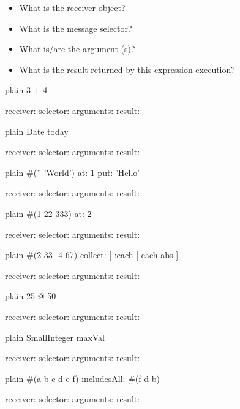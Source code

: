 \documentclass[10pt,twoside,english]{_support/latex/sbabook/sbabook}
\begin{document}
\begin{itemize}
\item What is the receiver object?
\item What is the message selector?
\item What is/are the argument (s)?
\item What is the result returned by this expression execution?
\end{itemize}

\begin{displaycode}{plain}
3 + 4

	receiver: 
	selector:
	arguments:
	result:
\end{displaycode}

\begin{displaycode}{plain}
Date today

	receiver: 
	selector:
	arguments:
	result:
\end{displaycode}

\begin{displaycode}{plain}
#('' 'World') at: 1 put: 'Hello'

	receiver: 
	selector:
	arguments:
	result:
\end{displaycode}

\begin{displaycode}{plain}
#(1 22 333) at: 2

	receiver: 
	selector:
	arguments:
	result:
\end{displaycode}

\begin{displaycode}{plain}
#(2 33 -4 67) collect: [ :each | each abs ]

	receiver: 
	selector:
	arguments:
	result:
\end{displaycode}

\begin{displaycode}{plain}
25 @ 50

	receiver: 
	selector:
	arguments:
	result:
\end{displaycode}

\begin{displaycode}{plain}
SmallInteger maxVal


	receiver: 
	selector:
	arguments:
	result:
\end{displaycode}

\begin{displaycode}{plain}
#(a b c d e f) includesAll: #(f d b)

	receiver: 
	selector:
	arguments:
	result:
\end{displaycode}
\end{document}
